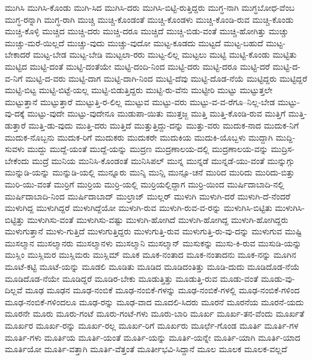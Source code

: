 {ಮುಗಿಸಿ
ಮುಗಿಸಿ-ಕೊಂಡು
ಮುಗಿ-ಸಿದ
ಮುಗಿಸಿ-ದರು
ಮುಗಿಸಿ-ಬಿಟ್ಟಿ-ರುತ್ತಿದ್ದರು
ಮುಗ್ಧ-ನಾಗಿ
ಮುಗ್ಧಬೋಧ-ವೆಂಬ
ಮುಗ್ಧ-ರನ್ನಾಗಿ
ಮುಗ್ಧ-ರಾಗಿ
ಮುಚ್ಚಿ
ಮುಚ್ಚಿ-ಕೊಂಡಂತೆ
ಮುಚ್ಚಿ-ಕೊಂಡಳು
ಮುಚ್ಚಿ-ಕೊಂಡಿ-ರುವ
ಮುಚ್ಚಿ-ಕೊಂಡು
ಮುಚ್ಚಿ-ಕೊಳ್ಳಿ
ಮುಚ್ಚಿದ
ಮುಚ್ಚಿ-ದರು
ಮುಚ್ಚಿ-ದರೂ
ಮುಚ್ಚಿದೆ
ಮುಚ್ಚಿ-ಬಿಡು-ವಂತೆ
ಮುಚ್ಚಿ-ಹೋಗಿತ್ತು
ಮುಚ್ಚು
ಮುಚ್ಚು-ಮರೆ-ಯಿಲ್ಲದೆ
ಮುಚ್ಚು-ವುದು
ಮುಚ್ಚು-ವುದೋ
ಮುಟ್ಟ-ಕೂಡದು
ಮುಟ್ಟದೆ
ಮುಟ್ಟ-ಬಹುದೆ
ಮುಟ್ಟ-ಬೇಕಾದರೆ
ಮುಟ್ಟ-ಬೇಡ
ಮುಟ್ಟ-ಬೇಡಿ
ಮುಟ್ಟಲಾ-ರರು
ಮುಟ್ಟ-ಲಿಲ್ಲ
ಮುಟ್ಟಲು
ಮುಟ್ಟಿ
ಮುಟ್ಟಿ-ಕೊಂಡು
ಮುಟ್ಟಿತು
ಮುಟ್ಟಿದ
ಮುಟ್ಟಿ-ದಂತೆ
ಮುಟ್ಟಿ-ದಂತೆಯೇ
ಮುಟ್ಟಿ-ದಂದಿ-ನಿಂದ
ಮುಟ್ಟಿ-ದರು
ಮುಟ್ಟಿ-ದರೂ
ಮುಟ್ಟಿ-ದರೆ
ಮುಟ್ಟಿ-ದ-ವ-ನಿಗೆ
ಮುಟ್ಟಿ-ದ-ವರು
ಮುಟ್ಟಿ-ದಾಗ
ಮುಟ್ಟಿ-ದಾಗಿ-ನಿಂದ
ಮುಟ್ಟಿ-ದೆವು
ಮುಟ್ಟಿ-ದೊಡ-ನೆಯೆ
ಮುಟ್ಟಿದ್ದರು
ಮುಟ್ಟಿದ್ದರೆ
ಮುಟ್ಟಿ-ಬಿಟ್ಟ
ಮುಟ್ಟಿ-ಬಿಟ್ಟೆ-ಯಲ್ಲ
ಮುಟ್ಟಿ-ಬಿಡುತ್ತಿದ್ದರು
ಮುಟ್ಟಿ-ರು-ವೆನು
ಮುಟ್ಟೀರಿ
ಮುಟ್ಟು
ಮುಟ್ಟುತ್ತಲೇ
ಮುಟ್ಟುತ್ತಾನೆ
ಮುಟ್ಟುತ್ತಾರೆ
ಮುಟ್ಟುತ್ತಿ-ರ-ಲಿಲ್ಲ
ಮುಟ್ಟುವ
ಮುಟ್ಟು-ವರು
ಮುಟ್ಟು-ವ-ವ-ರೆಗೂ--ನಿಲ್ಲ-ಬೇಡ
ಮುಟ್ಟು-ವು-ದಕ್ಕೆ
ಮುಟ್ಟು-ವುದೇ
ಮುಟ್ಟು-ವುದೇನೂ
ಮುಡುಪಾ-ಯಿತು
ಮುತ್ತಜ್ಜ
ಮುತ್ತಿ
ಮುತ್ತಿ-ಕೊಂಡಿ-ರುವ
ಮುತ್ತಿಗೆ
ಮುತ್ತಿ-ಡುತ್ತಾರೆ
ಮುತ್ತಿ-ಡು-ವುದು
ಮುತ್ತಿ-ದರು
ಮುತ್ತಿದೆ
ಮುತ್ತುತ್ತಿದ್ದು-ದನ್ನು
ಮುತ್ತು-ವರು
ಮುದುಕ-ನಾದ
ಮುದುಕ-ನಿಗೆ
ಮುದುಕ-ನೊಬ್ಬನು
ಮುದುಕ-ರಿಗೆ
ಮುದುಕರು
ಮುದುಕರೇ
ಮುದುಕಿಯ
ಮುದುಕಿ-ಯೊಬ್ಬಳು
ಮುದ್ದಾಗಿ
ಮುದ್ದಿ-ಸುವಳು
ಮುದ್ದು
ಮುದ್ದೆ-ಯಂತೆ
ಮುದ್ದೆ-ಯನ್ನು
ಮುದ್ರಣ
ಮುದ್ರಣಾಲಯ-ದಲ್ಲಿ
ಮುದ್ರಣಾಲಯ-ವನ್ನು
ಮುದ್ರಿಸ-ಬೇಕೆಂದು
ಮುದ್ರೆ
ಮುನಿಯ
ಮುನಿಸಿ-ಕೊಂಡಂತೆ
ಮುನಿಸಿಪಲ್
ಮುನ್ನ
ಮುನ್ನಡೆ
ಮುನ್ನಡೆ-ಯು-ವಂತೆ
ಮುನ್ನುಗ್ಗು
ಮುನ್ನುಡಿ-ಯನ್ನು
ಮುನ್ನುಡಿ-ಯಲ್ಲಿ
ಮುನ್ನೂರು
ಮುನ್ಶಿ
ಮುನ್ಷಿ
ಮುನ್ಸೂ-ಚನೆ
ಮುರಿದ
ಮುರಿದು
ಮುರಿದು-ಬಿತ್ತು
ಮುರಿ-ಯು-ವಂತೆ
ಮುರ್ರಿಗೆ
ಮುರ್ರಿಯ
ಮುರ್ರಿ-ಯಲ್ಲಿ
ಮುರ್ರಿಯಲ್ಲಿದ್ದಾಗ
ಮುರ್ರಿ-ಯಿಂದ
ಮುರ್ಷಿದಾಬಾದಿ-ನಲ್ಲಿ
ಮುರ್ಷಿದಾಬಾದಿ-ನಿಂದ
ಮುರ್ಷಿದಾಬಾದ್
ಮುಲ್ರಾಜ್
ಮುಲ್ಲರ್
ಮುಳುಗಿ
ಮುಳುಗಿ-ದರೆ
ಮುಳುಗಿ-ದೆ-ನೆಂದರೆ
ಮುಳುಗಿದ್ದ
ಮುಳುಗಿದ್ದರೆ
ಮುಳುಗಿದ್ದೆಯೋ
ಮುಳುಗಿ-ರುವ
ಮುಳುಗಿ-ರುವ-ವ-ರನ್ನು
ಮುಳುಗಿಸಿ-ಬಿಟ್ಟಿತು
ಮುಳುಗಿಸಿ-ಬಿಟ್ಟಿತ್ತು
ಮುಳುಗಿಸು-ವಂತೆ
ಮುಳುಗಿಸು-ವಷ್ಟು
ಮುಳುಗಿ-ಹೋಗಿದೆ
ಮುಳುಗಿ-ಹೋಗಿದ್ದ
ಮುಳುಗಿ-ಹೋಗಿದ್ದರು
ಮುಳುಗುತ್ತಾನೆ
ಮುಳು-ಗುತ್ತಿದೆ
ಮುಳುಗುತ್ತಿದ್ದರು
ಮುಳುಗುತ್ತಿ-ರುವ
ಮುಳುಗುತ್ತಿ-ರು-ವು-ದನ್ನು
ಮುಳುಗುವ
ಮುಷ್ಟಿ
ಮುಸಲ್ಮಾನ
ಮುಸಲ್ಮಾನರು
ಮುಸಲ್ಮಾನಳು
ಮುಸಲ್ಮಾನಿ
ಮುಸಲ್ಮಾನ್
ಮುಸುಕನ್ನು
ಮುಸು-ಕಿ-ರುವ
ಮುಸುಡಿ-ಯನ್ನು
ಮುಸ್ಲಿಂ
ಮುಸ್ಲಿಮರ
ಮುಸ್ಲಿಮರು
ಮುಸ್ಲಿಮ್
ಮೂಕ
ಮೂಕ-ನಂತಾದ
ಮೂಕ-ನಂತಾದನು
ಮೂಕ-ನನ್ನು
ಮೂಗಿನ
ಮೂಟೆ-ಕಟ್ಟಿ
ಮೂಟೆ-ಯನ್ನು
ಮೂಡಲಿ
ಮೂಡಿತು
ಮೂಡಿದ
ಮೂಡಿದಂತಿತ್ತು
ಮೂಡಿ-ದುದು
ಮೂಡಿದೊಡ-ನೆಯೆ
ಮೂಡಿದೊಡ-ನೆಯೇ
ಮೂಡಿದ್ದರೆ
ಮೂಡಿರ-ಬೇಕು
ಮೂಡುತ್ತಿತ್ತು
ಮೂಡುತ್ತಿ-ರುವ
ಮೂಡು-ವಂತೆ
ಮೂಡು-ವು-ದಿಲ್ಲವೆ
ಮೂಢ
ಮೂಢನ
ಮೂಢ-ನಂಬಿಕೆ
ಮೂಢ-ನಂಬಿಕೆ-ಗಳನ್ನು
ಮೂಢ-ನಂಬಿಕೆ-ಗಳಲ್ಲಿ
ಮೂಢ-ನಂಬಿಕೆ-ಗಳಿಂದ
ಮೂಢ-ನಂಬಿಕೆ-ಗಳಿಂದಲೂ
ಮೂಢ-ರನ್ನು
ಮೂಢ-ವಾದ
ಮೂದಲಿ-ಸಿದರು
ಮೂರನೆ
ಮೂರನೆಯ
ಮೂರನೆ-ಯದು
ಮೂರನೇ
ಮೂರು
ಮೂರು-ಗಂಟೆ
ಮೂರು-ಗಂಟೆ-ಗಳು
ಮೂರು-ಬಾರಿ
ಮೂರ್ಖ
ಮೂರ್ಖ-ತನ-ವೆಂದು
ಮೂರ್ಖತೆ
ಮೂರ್ಖರ
ಮೂರ್ಖ-ರನ್ನು
ಮೂರ್ಖ-ರಲ್ಲ
ಮೂರ್ಖ-ರಿಗೆ
ಮೂರ್ಖರು
ಮೂರ್ಛೆ-ಗೊಂಡ
ಮೂರ್ತಿ
ಮೂರ್ತಿ-ಗಳ
ಮೂರ್ತಿ-ಗಳು
ಮೂರ್ತಿಯ
ಮೂರ್ತಿ-ಯಂತೆ
ಮೂರ್ತಿ-ಯನ್ನು
ಮೂರ್ತಿ-ಯನ್ನೇ
ಮೂರ್ತಿ-ಯಾಗಿ
ಮೂರ್ತಿ-ಯಾದ
ಮೂರ್ತಿಯೋ
ಮೂರ್ತಿ-ವತ್ತಾಗಿ
ಮೂರ್ತಿ-ವೆತ್ತಂತೆ
ಮೂರ್ತೀಭವಿ-ಸಿದ್ದಾನೆ
ಮೂಲ
ಮೂಲಕ
ಮೂಲಕ-ವಲ್ಲದೆ
}

